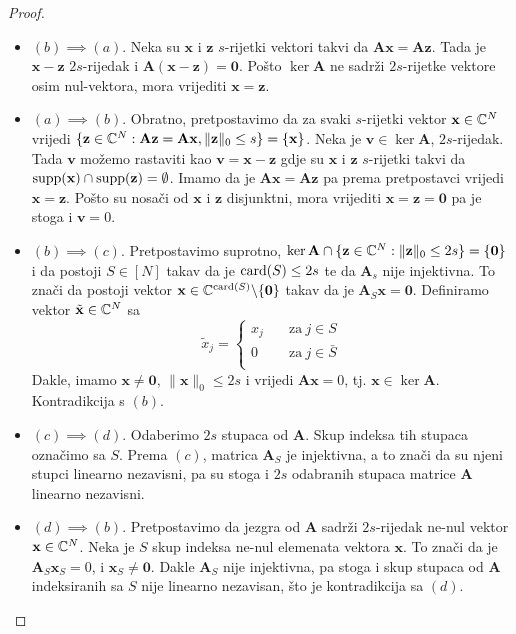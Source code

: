 \documentclass[a4paper,twoside,12pt]{memoir} %
\newcommand{\vect}[1]{\mathbf{#1}}
\newcommand{\card}{\text{\normalfont{card}}}
\newcommand{\supp}{\text{\normalfont{supp}}}
\newcommand{\norm}[1]{\|{#1}\|}
\begin{document}
\begin{proof}
    \begin{itemize}
        \item[]$(b)\implies(a)$. Neka su $\vect x$ i $\vect z$ $s$-rijetki vektori takvi da $\vect{Ax} = \vect{Az}$. Tada je $\vect x - \vect z$ $2s$-rijedak i $\vect A(\vect x - \vect z) = \vect 0$. Po\v{s}to $\ker \vect A$ ne sadr\v{z}i $2s$-rijetke vektore osim nul-vektora, mora vrijediti $\vect x = \vect z$. \\
        \item[] $(a)\implies(b)$. Obratno, pretpostavimo da za svaki $s$-rijetki vektor $\vect x \in \C^N$ vrijedi $\{\vect z \in \C^N : \vect{Az} = \vect{Ax}, \norm{\vect z}_0 \leq s\} = \{\vect x\}$. Neka je $\vect v \in \ker \vect A$, $2s$-rijedak. Tada $\vect v$ mo\v{z}emo rastaviti kao $\vect v = \vect x - \vect z$ gdje su $\vect x$ i $\vect z$ $s$-rijetki takvi da $\supp(\vect x)\cap \supp(\vect z) = \emptyset$. Imamo da je $\vect{Ax}=\vect{Az}$ pa prema pretpostavci vrijedi $\vect{x}=\vect{z}$. Po\v{s}to su nosa\v{c}i od $\vect x$ i $\vect z$ disjunktni, mora vrijediti $\vect x = \vect z = \vect 0$ pa je stoga i $\vect v = 0$.\\
        \item[] $(b)\implies(c)$. Pretpostavimo suprotno, $\ker \vect A \cap \{\vect z \in \C^N: \norm{\vect z}_0 \leq 2s\} = \{\vect 0\}$ i da postoji $S \in [N]$ takav da je $\card(S) \leq 2s$ te da $\vect A_s$ nije injektivna. To zna\v{c}i da postoji vektor $\vect x \in \C^{\card(S)} \backslash \{\vect 0\}$ takav da je $\vect A_S \vect x = \vect 0$. Definiramo vektor $\tilde{\vect{x}}\in \C^N$ sa 
            \begin{equation*}
                \tilde{x}_j = 
                \begin{cases}
                    x_j \quad & \text{za}\ j \in S \\
                    0 \quad & \text{za}\  j \in \bar S \\
                \end{cases}
            \end{equation*}
            Dakle, imamo $\vect x \neq \vect 0$, $\norm{\vect x}_0 \leq 2s$ i vrijedi $\vect{Ax}=0$, tj. $\vect x \in \ker \vect A$. Kontradikcija s $(b)$.
        \item[]$(c)\implies(d)$. Odaberimo $2s$  stupaca od $\vect A$. Skup indeksa tih stupaca ozna\v{c}imo sa $S$. Prema $(c)$, matrica $\vect A_S$ je injektivna, a to zna\v{c}i da su njeni stupci linearno nezavisni, pa su stoga i $2s$ odabranih stupaca matrice $\vect A$ linearno nezavisni.
        \item[]$(d)\implies(b)$. Pretpostavimo da jezgra od $\vect A$ sadr\v{z}i $2s$-rijedak ne-nul vektor $\vect x \in \C^N$. Neka je $S$ skup indeksa ne-nul elemenata vektora $\vect x$. To zna\v{c}i da je $\vect A_S \vect x_S = 0$, i $\vect x_S \neq \vect 0$. Dakle $\vect A_S$ nije injektivna, pa stoga i skup stupaca od $\vect A$ indeksiranih sa $S$ nije linearno nezavisan, \v{s}to je kontradikcija sa $(d)$.
\end{itemize}
\end{proof}
\end{document}
